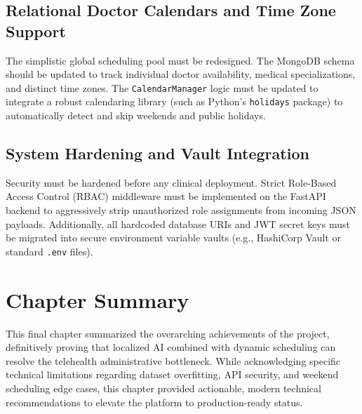\documentclass[12pt,a4paper]{report}
\begin{document}
\subsection{Relational Doctor Calendars and Time Zone Support}
The simplistic global scheduling pool must be redesigned. The MongoDB schema should be updated to track individual doctor availability, medical specializations, and distinct time zones. The \texttt{CalendarManager} logic must be updated to integrate a robust calendaring library (such as Python's \texttt{holidays} package) to automatically detect and skip weekends and public holidays.

\subsection{System Hardening and Vault Integration}
Security must be hardened before any clinical deployment. Strict Role-Based Access Control (RBAC) middleware must be implemented on the FastAPI backend to aggressively strip unauthorized role assignments from incoming JSON payloads. Additionally, all hardcoded database URIs and JWT secret keys must be migrated into secure environment variable vaults (e.g., HashiCorp Vault or standard \texttt{.env} files).

\section{Chapter Summary}
This final chapter summarized the overarching achievements of the project, definitively proving that localized AI combined with dynamic scheduling can resolve the telehealth administrative bottleneck. While acknowledging specific technical limitations regarding dataset overfitting, API security, and weekend scheduling edge cases, this chapter provided actionable, modern technical recommendations to elevate the platform to production-ready status.
\end{document}

